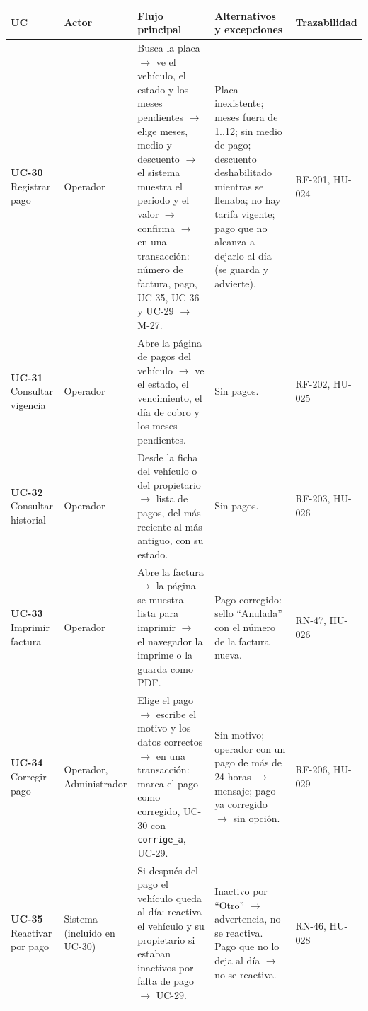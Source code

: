 \begin{longtable}{>{\raggedright\arraybackslash}p{2.4000000000000004cm}>{\raggedright\arraybackslash}p{2.6cm}>{\raggedright\arraybackslash}p{2.8cm}>{\raggedright\arraybackslash}p{4.2cm}>{\raggedright\arraybackslash}p{2.4000000000000004cm}}
\toprule
\textbf{UC} & \textbf{Actor} & \textbf{Flujo principal} & \textbf{Alternativos y excepciones} & \textbf{Trazabilidad}\\
\midrule\endhead
\textbf{UC-30} Registrar pago & Operador & Busca la placa $\rightarrow$ ve el vehículo, el estado y los meses pendientes $\rightarrow$ elige meses, medio y descuento $\rightarrow$ el sistema muestra el periodo y el valor $\rightarrow$ confirma $\rightarrow$ en una transacción: número de factura, pago, UC-35, UC-36 y UC-29 $\rightarrow$ M-27. & Placa inexistente; meses fuera de 1..12; sin medio de pago; descuento deshabilitado mientras se llenaba; no hay tarifa vigente; pago que no alcanza a dejarlo al día (se guarda y advierte). & RF-201, HU-024\\
\textbf{UC-31} Consultar vigencia & Operador & Abre la página de pagos del vehículo $\rightarrow$ ve el estado, el vencimiento, el día de cobro y los meses pendientes. & Sin pagos. & RF-202, HU-025\\
\textbf{UC-32} Consultar historial & Operador & Desde la ficha del vehículo o del propietario $\rightarrow$ lista de pagos, del más reciente al más antiguo, con su estado. & Sin pagos. & RF-203, HU-026\\
\textbf{UC-33} Imprimir factura & Operador & Abre la factura $\rightarrow$ la página se muestra lista para imprimir $\rightarrow$ el navegador la imprime o la guarda como PDF. & Pago corregido: sello ``Anulada'' con el número de la factura nueva. & RN-47, HU-026\\
\textbf{UC-34} Corregir pago & Operador, Administrador & Elige el pago $\rightarrow$ escribe el motivo y los datos correctos $\rightarrow$ en una transacción: marca el pago como corregido, UC-30 con \texttt{corrige\_a}, UC-29. & Sin motivo; operador con un pago de más de 24 horas $\rightarrow$ mensaje; pago ya corregido $\rightarrow$ sin opción. & RF-206, HU-029\\
\textbf{UC-35} Reactivar por pago & Sistema (incluido en UC-30) & Si después del pago el vehículo queda al día: reactiva el vehículo y su propietario si estaban inactivos por falta de pago $\rightarrow$ UC-29. & Inactivo por ``Otro'' $\rightarrow$ advertencia, no se reactiva. Pago que no lo deja al día $\rightarrow$ no se reactiva. & RN-46, HU-028\\

\end{longtable}
